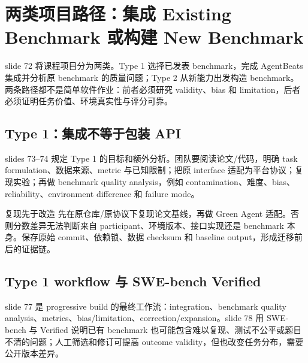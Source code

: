 \section{两类项目路径：集成 Existing Benchmark 或构建 New Benchmark}

slide 72 将课程项目分为两类。Type 1 选择已发表 benchmark，完成 AgentBeats 集成并分析原 benchmark 的质量问题；Type 2 从新能力出发构造 benchmark。两条路径都不是简单软件作业：前者必须研究 validity、bias 和 limitation，后者必须证明任务价值、环境真实性与评分可靠。


\subsection{Type 1：集成不等于包装 API}

slides 73--74 规定 Type 1 的目标和额外分析。团队要阅读论文/代码，明确 task formulation、数据来源、metric 与已知限制；把原 interface 适配为平台协议；复现实验；再做 benchmark quality analysis，例如 contamination、难度、bias、reliability、environment difference 和 failure mode。


\begin{importantbox}{复现先于改造}
先在原仓库/原协议下复现论文基线，再做 Green Agent 适配。否则分数差异无法判断来自 participant、环境版本、接口实现还是 benchmark 本身。保存原始 commit、依赖锁、数据 checksum 和 baseline output，形成迁移前后的证据链。
\end{importantbox}

\subsection{Type 1 workflow 与 SWE-bench Verified}

slide 77 是 progressive build 的最终工作流：integration、benchmark quality analysis、metrics、bias/limitation、correction/expansion。slide 78 用 SWE-bench 与 Verified 说明已有 benchmark 也可能包含难以复现、测试不公平或题目不清的问题；人工筛选和修订可提高 outcome validity，但也改变任务分布，需要公开版本差异。


